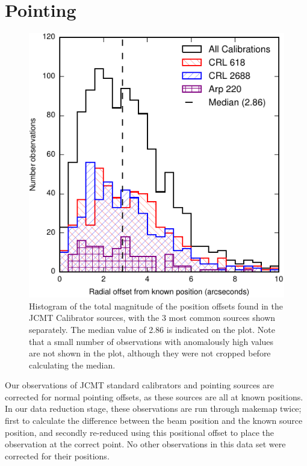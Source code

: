 \documentclass[twocolumn,times]{aastex6}
\begin{document}
\section{Pointing}
\begin{figure}
  \centering
  \includegraphics{pointing-offsets-by-source.pdf}
  \caption{Histogram of the total magnitude of the position offsets
    found in the JCMT Calibrator sources, with the 3 most common
    sources shown separately. The median value of 2.86\arcsec{} is
    indicated on the plot. Note that a small number of observations
    with anomalously high values are not shown in the plot, although
    they were not cropped before calculating the median.}
  \label{fig:pointing}
\end{figure}

Our observations of JCMT standard calibrators and pointing sources are
corrected for normal pointing offsets, as these sources are all at
known positions. In our data reduction stage, these observations are
run through makemap twice; first to calculate the difference between
the beam position and the known source position, and secondly
re-reduced using this positional offset to place the observation at
the correct point. No other observations in this data set were
corrected for their positions.
\end{document}
